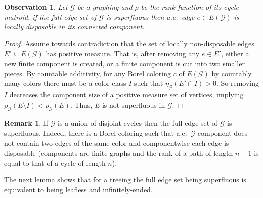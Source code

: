 \documentclass{article}
\theoremstyle{plain}
\newtheorem{obs}[thm]{Observation}
\theoremstyle{definition}
\newtheorem{rem}[thm]{Remark}
\newcommand{\cG}{\mathcal{G}}
\begin{document}
\begin{obs}
    Let $\cG$ be a graphing and $\rho$ be the rank function of its  cycle matroid, if the full edge set of $\cG$ is superfluous then a.e.~edge $e\in E(\cG)$ is locally disposable in its connected component.
\end{obs}
\begin{proof}
    Assume towards contradiction that  the set of locally non-disposable edges $E'\subseteq E(\cG)$ has positive measure. That is, after removing any $e\in E'$, either a new finite component is created, or a finite component is cut into two smaller pieces.  By countable additivity, for any Borel coloring $c$ of $E(\cG)$ by countably many colors there must be a color class $I$ such that $\eta_{\cG}(E'\cap I)>0$. So removing $I$ decreases the component size of a positive measure set of vertices, implying $\rho_{\cG}(E\setminus I) <\rho_{\cG}(E)$. Thus, $E$ is not superfluous in $\cG$.
\end{proof}



\begin{rem}\label{rem:cycle_is_super}
If $\cG$ is a union of disjoint cycles then the full edge set of $\cG$ is superfluous. Indeed, there is a Borel coloring such that a.e.~$\cG$-component does not contain two edges of the same color and componentwise each edge is disposable (components are finite graphs and the rank of a path of length $n-1$ is equal to that of a cycle of length $n$).
\end{rem} 


The next lemma shows that for a treeing the full edge set being superfluous is equivalent to being leafless and infinitely-ended.
\end{document}
